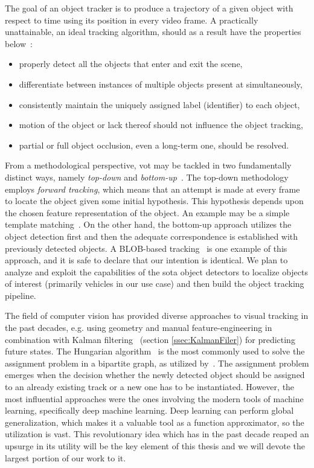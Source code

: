 The goal of an object tracker is to produce a trajectory of a given object with respect to time using its position in every video frame. A practically unattainable, an ideal tracking algorithm, should as a result have the properties below~\cite{Jalal2012}:

\begin{itemize}
    \item properly detect all the objects that enter and exit the scene,
    \item differentiate between instances of multiple objects present at simultaneously,
    \item consistently maintain the uniquely assigned label (identifier) to each object,
    \item motion of the object or lack thereof should not influence the object tracking,
    \item partial or full object occlusion, even a long-term one, should be resolved.
\end{itemize}

From a methodological perspective, \gls{vot} may be tackled in two fundamentally distinct ways, namely \emph{top-down} and \emph{bottom-up}~\cite{Jalal2012}. The top-down methodology employs \emph{forward tracking}, which means that an attempt is made at every frame to locate the object given some initial hypothesis. This hypothesis depends upon the chosen feature representation of the object. An example may be a simple template matching~\cite{comaniciu2003kernel}. On the other hand, the bottom-up approach utilizes the object detection first and then the adequate correspondence is established with previously detected objects. A BLOB-based tracking~\cite{wren1997pfinder} is one example of this approach, and it is safe to declare that our intention is identical. We plan to analyze and exploit the capabilities of the \gls{sota} object detectors to localize objects of interest (primarily vehicles in our use case) and then build the object tracking pipeline.

The field of computer vision has provided diverse approaches to visual tracking in the past decades, e.g. using geometry and manual feature-engineering in combination with Kalman filtering~\cite{Kalman1960} (section \ref{ssec:KalmanFiler}) for predicting future states. The Hungarian algorithm~\cite{Kuhn55thehungarian} is the most commonly used to solve the assignment problem in a bipartite graph, as utilized by~\cite{Bewley2016}. The assignment problem emerges when the decision whether the newly detected object should be assigned to an already existing track or a new one has to be instantiated. However, the most influential approaches were the ones involving the modern tools of machine learning, specifically deep machine learning. Deep learning can perform global generalization, which makes it a valuable tool as a function approximator, so the utilization is vast. This revolutionary idea which has in the past decade reaped an upsurge in its utility will be the key element of this thesis and we will devote the largest portion of our work to it.

